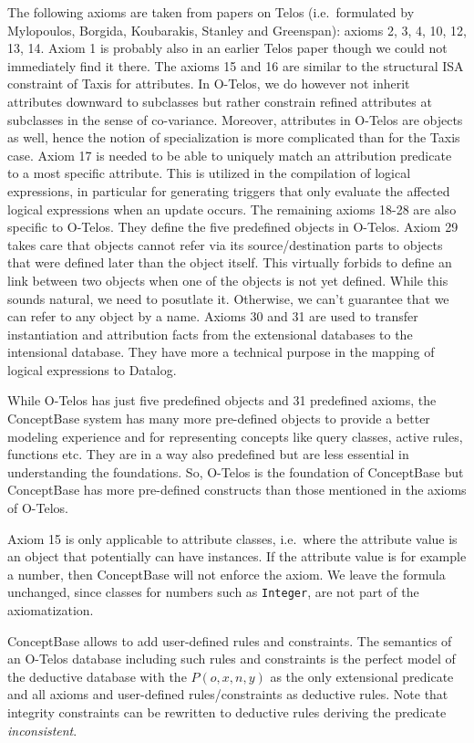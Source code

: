 The following axioms are taken from papers on Telos (i.e.\ formulated by Mylopoulos,
Borgida, Kouba\-ra\-kis, Stanley and Greenspan): axioms 2, 3, 4, 10, 12, 13, 14.
Axiom 1 is probably also in an earlier Telos paper though we could not 
immediately find it there. The axioms 15 and 16 are similar to the structural
ISA constraint of Taxis \cite{Taxis80} for attributes. 
In O-Telos, we do however not inherit attributes downward to subclasses 
but rather constrain refined attributes at subclasses in the sense
of co-variance. 
Moreover, attributes in O-Telos are objects as well, hence the notion of specialization is
more complicated than for the Taxis case.
Axiom 17 is needed
to be able to uniquely match an attribution predicate to a most specific attribute.
This is utilized in the compilation of logical expressions, in particular for
generating triggers that only evaluate the affected logical expressions when an update
occurs. The remaining axioms 18-28 are also specific to O-Telos. They define the five
predefined objects in O-Telos. Axiom 29 takes care that objects cannot refer via
its source/destination parts to objects that were defined later than the object itself.
This virtually forbids to define an link between two objects when one of the objects is
not yet defined. While this sounds natural, we need to posutlate it. Otherwise, we can't
guarantee that we can refer to any object by a name.
Axioms 30 and 31 are used to transfer instantiation
and attribution facts from the extensional databases to the intensional database.
They have more a technical purpose in the mapping of logical expressions to
Datalog.

While O-Telos has just five predefined objects and 31 predefined axioms, the
ConceptBase system has many more pre-defined objects to provide a better
modeling experience and for representing concepts like query classes, active
rules, functions etc. They are in a way also predefined but are less essential
in understanding the foundations. So, O-Telos is the foundation of ConceptBase
but ConceptBase has more pre-defined constructs than those mentioned in
the axioms of O-Telos. 

Axiom 15 is only applicable to attribute classes, i.e.\ where the attribute value is
an object that potentially can have instances. If the attribute value is for example
a number, then ConceptBase will not enforce the axiom. We leave the formula unchanged,
since classes for numbers such as {\tt Integer}, are not part of the axiomatization.


ConceptBase allows to add user-defined rules and constraints. The semantics
of an O-Telos database including such rules and constraints is 
the perfect model of the deductive database with the $P(o,x,n,y)$
as the only extensional predicate and all axioms and user-defined rules/constraints
as deductive rules. Note that integrity constraints can be rewritten to deductive rules
deriving the predicate {\it inconsistent}.

